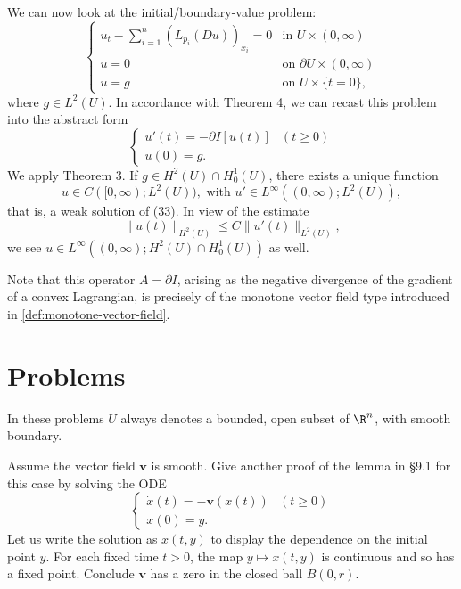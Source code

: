 \begin{example}
\label{ex:quasilinear-parabolic-gradient-flow}
We can now look at the initial/boundary-value problem:
\[
\begin{cases}
u_t - \sum_{i=1}^n (L_{p_i}(Du))_{x_i} = 0 & \text{in } U \times (0, \infty) \\
u = 0 & \text{on } \partial U \times (0, \infty) \\
u = g & \text{on } U \times \{t = 0\},
\end{cases}
\tag{33}
\]
where $g \in L^2(U)$. In accordance with Theorem 4, we can recast this problem into the abstract form
\[
\begin{cases} u'(t) = -\partial I[u(t)] & (t \geq 0) \\ u(0) = g. \end{cases}
\tag{34}
\]
We apply Theorem 3. If $g \in H^2(U) \cap H^1_0(U)$, there exists a unique function
\[
u \in C([0,\infty); L^2(U)), \text{ with } u' \in L^\infty((0,\infty); L^2(U)),
\]
that is, a weak solution of (33). In view of the estimate
\[
\|u(t)\|_{H^2(U)} \leq C\|u'(t)\|_{L^2(U)},
\]
we see $u \in L^\infty((0,\infty); H^2(U) \cap H^1_0(U))$ as well.
\end{example}

Note that this operator $A = \partial I$, arising as the negative divergence of the gradient of a convex Lagrangian, is precisely of the monotone vector field type introduced in \cref{def:monotone-vector-field}.

\section{Problems}
\label{sec:problems-ch9}

In these problems $U$ always denotes a bounded, open subset of $\R^n$, with smooth boundary.

\begin{exercise}
Assume the vector field $\mathbf{v}$ is smooth. Give another proof of the lemma in \S9.1 for this case by solving the ODE
\[
\begin{cases} \dot{x}(t) = -\mathbf{v}(x(t)) & (t \geq 0) \\ x(0) = y. \end{cases}
\]
Let us write the solution as $x(t, y)$ to display the dependence on the initial point $y$. For each fixed time $t > 0$, the map $y \mapsto x(t, y)$ is continuous and so has a fixed point. Conclude $\mathbf{v}$ has a zero in the closed ball $B(0, r)$.
\end{exercise}

